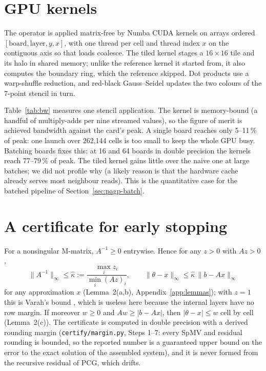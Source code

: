

\section{GPU kernels}
\label{sec:pagp-kernels}
The operator is applied matrix-free by Numba CUDA kernels on arrays ordered
$[\text{board},\text{layer},y,x]$, with one thread per cell and thread index $x$ on the
contiguous axis so that loads coalesce. The tiled kernel stages a $16\times16$ tile and its halo
in shared memory; unlike the reference kernel it started from, it also computes the boundary
ring, which the reference skipped. Dot products use a warp-shuffle reduction, and red-black
Gauss--Seidel updates the two colours of the 7-point stencil in turn.

Table~\ref{tab:bw} measures one stencil application. The kernel is memory-bound (a handful of
multiply-adds per nine streamed values), so the figure of merit is achieved bandwidth against the
card's peak. A single board reaches only 5--11\,\% of peak: one launch over 262{,}144 cells is too
small to keep the whole GPU busy. Batching boards fixes this: at 16 and 64 boards in double
precision the kernels reach 77--79\,\% of peak. The tiled kernel gains little over the naive one
at large batches; we did not profile why (a likely reason is that the hardware cache already
serves most neighbour reads). This is the quantitative case for the batched pipeline of
Section~\ref{sec:pagp-batch}.



\section{A certificate for early stopping}
\label{sec:pagp-cert}
For a nonsingular M-matrix, $A^{-1}\ge 0$ entrywise. Hence for any $z>0$ with $Az>0$,
\[
  \|A^{-1}\|_\infty \le \hat\kappa := \frac{\max_i z_i}{\min_i (Az)_i},
  \qquad
  \|\theta - x\|_\infty \le \hat\kappa\,\|b - Ax\|_\infty
\]
for any approximation $x$ (Lemma~2(a,b), Appendix~\ref{app:lemmas}); with $z = 1$ this is Varah's
bound \cite{varah1975}, which is useless here because the internal layers have no row margin.
If moreover $w\ge0$ and $Aw\ge|b-Ax|$, then $|\theta-x|\le w$ cell by cell (Lemma~2(c)). The
certificate is computed in double precision with a derived rounding margin
(\texttt{certify/margin.py}, Steps 1--7: every SpMV and residual rounding is bounded, so the
reported number is a guaranteed upper bound on the error to the exact solution of the assembled
system), and it is never formed from the recursive residual of PCG, which drifts.

